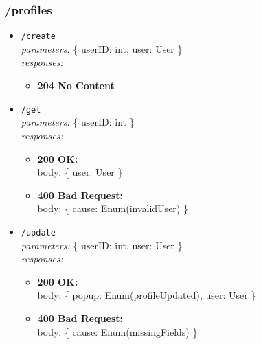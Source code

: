 \subsubsection*{/profiles}
\begin{itemize}
    \item \texttt{/create} \\
        \textit{parameters:} \{ userID: int, user: User \} \\
        \textit{responses:}
        \begin{itemize}
            \item \textbf{204 No Content}
        \end{itemize}
    \item \texttt{/get} \\
        \textit{parameters:} \{ userID: int \} \\
        \textit{responses:}
        \begin{itemize}
            \item \textbf{200 OK:} \\
            body: \{ user: User \}
            \item \textbf{400 Bad Request:} \\
            body: \{ cause: Enum(invalidUser) \}
        \end{itemize}
    \item \texttt{/update} \\
        \textit{parameters:} \{ userID: int, user: User \} \\
        \textit{responses:}
        \begin{itemize}
            \item \textbf{200 OK:} \\
            body: \{ popup: Enum(profileUpdated), user: User \}
            \item \textbf{400 Bad Request:} \\
            body: \{ cause: Enum(missingFields) \}
        \end{itemize}
\end{itemize}

